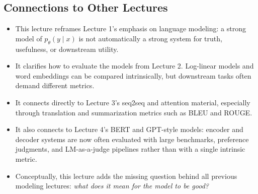 \documentclass[11pt]{article}
\begin{document}
\subsection{Connections to Other Lectures}
\begin{itemize}
    \item This lecture reframes Lecture 1's emphasis on language modeling: a strong model of \(p_\theta(y \mid x)\) is not automatically a strong system for truth, usefulness, or downstream utility.
    \item It clarifies how to evaluate the models from Lecture 2. Log-linear models and word embeddings can be compared intrinsically, but downstream tasks often demand different metrics.
    \item It connects directly to Lecture 3's seq2seq and attention material, especially through translation and summarization metrics such as BLEU and ROUGE.
    \item It also connects to Lecture 4's BERT and GPT-style models: encoder and decoder systems are now often evaluated with large benchmarks, preference judgments, and LM-as-a-judge pipelines rather than with a single intrinsic metric.
    \item Conceptually, this lecture adds the missing question behind all previous modeling lectures: \emph{what does it mean for the model to be good?}
\end{itemize}
\end{document}
